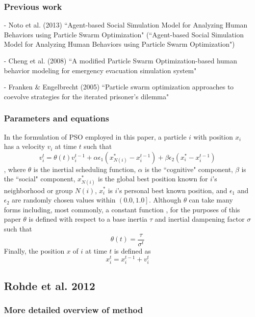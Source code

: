 \documentclass[12pt]{article}
\begin{document}
\subsubsection{Previous work}
- Noto et al. (2013) ``Agent-based Social Simulation Model for Analyzing Human Behaviors using Particle Swarm Optimization" (``Agent-based Social Simulation Model for Analyzing Human Behaviors using Particle Swarm Optimization")

- Cheng et al. (2008) ``A modified Particle Swarm Optimization-based human behavior modeling for emergency evacuation simulation system"

- Franken \& Engelbrecht (2005) ``Particle swarm optimization approaches to coevolve strategies for the iterated prisoner's dilemma"

\subsubsection{Parameters and equations}
In the formulation of PSO employed in this paper, a particle $i$ with position $x_i$ has a velocity $v_i$ at time $t$ such that
\[
v_i^t = \theta(t) v_i^{t-1} + \alpha \epsilon_1 (x_{N(i)}^* - x_i^{t-1}) + \beta \epsilon_2 (x_i^* - x_i^{t-1})
\],
where $\theta$ is the inertial scheduling function, $\alpha$ is the ``cognitive" component, $\beta$ is the ``social" component, $x_{N(i)}^*$ is the global best position known for $i$'s neighborhood or group $N(i)$, $x_i^*$ is $i$'s personal best known position, and $\epsilon_1$ and $\epsilon_2$ are randomly chosen values within $\left(0.0, 1.0\right]$. Although $\theta$ can take many forms including, most commonly, a constant function \citep[p.~101]{yang2014}, for the purposes of this paper $\theta$ is defined with respect to a base inertia $\tau$ and inertial dampening factor $\sigma$ such that
\[
\theta(t) = \frac{\tau}{\sigma^t} 
\]
Finally, the position $x$ of $i$ at time $t$ is defined as
\[
x_i^t = x_i^{t-1} + v_i^t 
\]

\subsection{Rohde et al. 2012}
\subsubsection{More detailed overview of method}
\end{document}
